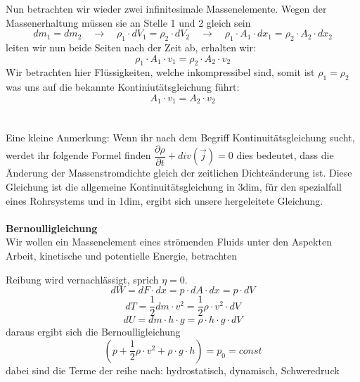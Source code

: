 \documentclass[12pt]{article}
\begin{document}
 \begin{figure}[H]
  \label{fig:1teil}
\end{figure}
Nun betrachten wir wieder zwei infinitesimale Massenelemente. Wegen der Massenerhaltung müssen sie an Stelle 1 und 2 gleich sein
\begin{equation}
dm_1 = dm_2 \quad \rightarrow \quad \rho_1 \cdot dV_1 = \rho_2 \cdot dV_2 \quad \rightarrow \quad \rho_1 \cdot A_1 \cdot dx_1 = \rho_2 \cdot A_2 \cdot dx_2
\end{equation}
leiten wir nun beide Seiten nach der Zeit ab, erhalten wir:
\begin{equation}
\rho_1 \cdot A_1 \cdot v_1 = \rho_2 \cdot A_2 \cdot v_2
\end{equation}
Wir betrachten hier Flüssigkeiten, welche inkompressibel sind, somit ist $\rho_1 = \rho_2$ was uns auf die bekannte Kontiniutätsgleichung führt:
\begin{equation}
A_1 \cdot v_1 = A_2 \cdot v_2
\end{equation}
\\
\\ 
Eine kleine Anmerkung: Wenn ihr nach dem Begriff Kontinuitätsgleichung sucht, werdet ihr folgende Formel finden $\dfrac{\partial \rho}{\partial t} + div(\vec{j}) = 0$ dies bedeutet, dass die Änderung der Massenstromdichte gleich der zeitlichen Dichteänderung ist. Diese Gleichung ist die allgemeine Kontinuitätsgleichung in 3dim, für den spezialfall eines Rohrsystems und in 1dim, ergibt sich unsere hergeleitete Gleichung.
\\
\\\textbf{Bernoulligleichung}
\\
Wir wollen ein Massenelement eines strömenden Fluids unter den Aspekten Arbeit, kinetische und potentielle Energie, betrachten
 \begin{figure}[H]
  \label{fig:1teil}
\end{figure}
Reibung wird vernachlässigt, sprich $\eta = 0$.
\begin{equation}
dW = dF \cdot dx = p \cdot dA \cdot dx = p \cdot dV
\end{equation}
\begin{equation}
dT = \dfrac{1}{2} dm \cdot v^2 = \dfrac{1}{2} \rho \cdot v^2 \cdot dV
\end{equation}
\begin{equation}
dU = dm \cdot h \cdot g = \rho \cdot h \cdot g \cdot dV
\end{equation}
daraus ergibt sich die Bernoulligleichung
\begin{equation}
\left(p + \dfrac{1}{2} \rho \cdot v^2 + \rho \cdot g \cdot h \right) = p_0 = const
\end{equation}
dabei sind die Terme der reihe nach: hydrostatisch, dynamisch, Schweredruck
\end{document}
